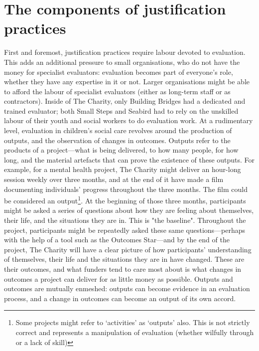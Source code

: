 \section{The components of justification practices}
\label{sec:6-3-components}
First and foremost, justification practices require labour devoted to evaluation. This adds an additional pressure to small organisations, who do not have the money for specialist evaluators: evaluation becomes part of everyone's role, whether they have any expertise in it or not. Larger organisations might be able to afford the labour of specialist evaluators (either as long-term staff or as contractors). Inside of The Charity, only Building Bridges had a dedicated and trained evaluator; both Small Steps and Seabird had to rely on the unskilled labour of their youth and social workers to do evaluation work. At a rudimentary level, evaluation in children's social care revolves around the production of outputs, and the observation of changes in outcomes. Outputs refer to the products of a project—what is being delivered, to how many people, for how long, and the material artefacts that can prove the existence of these outputs. For example, for a mental health project,  The Charity might deliver an hour-long session weekly over three months, and at the end of it have made a film documenting individuals' progress throughout the three months. The film could be considered an output\footnote{Some projects might refer to `activities' as `outputs' also. This is not strictly correct and represents a manipulation of evaluation (whether wilfully through or a lack of skill)}. At the beginning of those three months,  participants might be asked a series of questions about how they are feeling about themselves, their life, and the situations they are in. This is "the baseline". Throughout the project,  participants might be repeatedly asked these same questions—perhaps with the help of a tool such as the Outcomes Star—and by the end of the project, The Charity will have a clear picture of how participants' understanding of themselves, their life and the situations they are in have changed. These are their outcomes, and what funders tend to care most about is what changes in outcomes a project can deliver for as little money as possible. Outputs and outcomes are mutually enmeshed: outputs can become evidence in an evaluation process, and a change in outcomes can become an output of its own accord.

